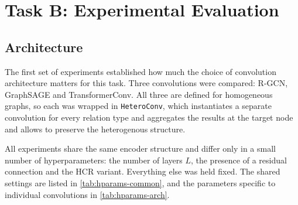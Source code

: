 \chapter{Task B: Experimental Evaluation}
\label{ch:taskB-eval}


\section{Architecture}

The first set of experiments established how much the choice of
convolution architecture matters for this task. Three convolutions were
compared: R-GCN, GraphSAGE and TransformerConv. All three are defined for
homogeneous graphs, so each was wrapped in \texttt{HeteroConv}, which
instantiates a separate convolution for every relation type and aggregates
the results at the target node and allows to preserve the heterogenous structure. 

All experiments share the same encoder structure and differ only in a small
number of hyperparameters: the number of layers $L$, the presence of a
residual connection and the HCR variant. Everything
else was held fixed. The shared settings are listed in
\cref{tab:hparams-common}, and the parameters specific to individual
convolutions in \cref{tab:hparams-arch}.

